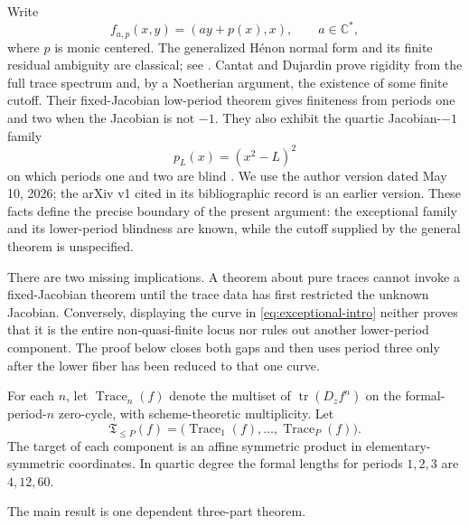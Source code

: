 \documentclass[11pt]{article}
\theoremstyle{definition}
\newcommand{\C}{\mathbb C}
\newcommand{\tr}{\operatorname{tr}}
\newcommand{\Trace}{\operatorname{Trace}}
\begin{document}
Write
\begin{equation}
f_{a,p}(x,y)=(ay+p(x),x),
\qquad a\in \C^*,
\label{eq:henon-normal-form-intro}
\end{equation}
where $p$ is monic centered. The generalized H\'enon normal form and its finite residual ambiguity are classical; see \cite{FriedlandMilnor1989}. Cantat and Dujardin prove rigidity from the full trace spectrum and, by a Noetherian argument, the existence of some finite cutoff. Their fixed-Jacobian low-period theorem gives finiteness from periods one and two when the Jacobian is not $-1$. They also exhibit the quartic Jacobian-$-1$ family
\begin{equation}
p_L(x)=(x^2-L)^2
\label{eq:exceptional-intro}
\end{equation}
on which periods one and two are blind \cite{CantatDujardin2026}. We use the author version dated May 10, 2026; the arXiv v1 cited in its bibliographic record is an earlier version. These facts define the precise boundary of the present argument: the exceptional family and its lower-period blindness are known, while the cutoff supplied by the general theorem is unspecified.

There are two missing implications. A theorem about pure traces cannot invoke a fixed-Jacobian theorem until the trace data has first restricted the unknown Jacobian. Conversely, displaying the curve in \eqref{eq:exceptional-intro} neither proves that it is the entire non-quasi-finite locus nor rules out another lower-period component. The proof below closes both gaps and then uses period three only after the lower fiber has been reduced to that one curve.

For each $n$, let $\Trace_n(f)$ denote the multiset of $\tr(D_zf^n)$ on the formal-period-$n$ zero-cycle, with scheme-theoretic multiplicity. Let
\[
\mathfrak T_{\le P}(f)
=
\bigl(\Trace_1(f),\ldots,\Trace_P(f)\bigr).
\]
The target of each component is an affine symmetric product in elementary-symmetric coordinates. In quartic degree the formal lengths for periods $1,2,3$ are $4,12,60$.

The main result is one dependent three-part theorem.
\end{document}
